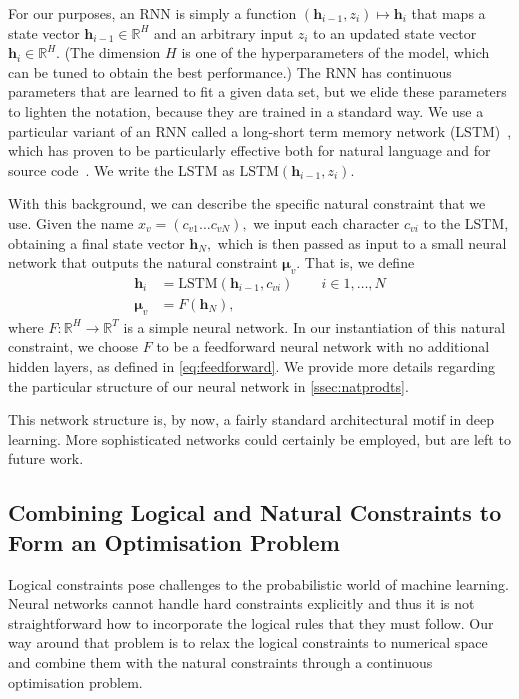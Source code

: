 \documentclass[acmsmall,nonacm]{acmart}\settopmatter{printfolios=true,printccs=false,printacmref=false}
\newcommand{\margincomment}[2]{\marginpar{\scriptsize\color{Maroon}#1 says: #2}}
\newcommand{\ivp}[1]{\margincomment{IVP}{#1}}
\begin{document}
For our purposes, an RNN is simply a function $(\bm{h}_{i-1}, z_i) \mapsto \bm{h}_{i}$
that maps a state vector $\bm{h}_{i-1} \in \mathbb{R}^H$
and an arbitrary input $z_i$ to an updated state vector $\bm{h}_{i}  \in \mathbb{R}^H$.
(The dimension $H$ is one of the hyperparameters of the model, which can be tuned
to obtain the best performance.)
The RNN has continuous parameters that are learned to fit a given data set,
but we elide these parameters to lighten the notation, because they are trained in a standard way.
We use a particular variant of an RNN called a
long-short term memory network (LSTM)~\cite{hochreiter97},
which has proven to be particularly effective both for natural language
and for source code~\cite{sundermeyer2012,melis17,white2015,dam16}.
We write the LSTM as $\text{LSTM}(\bm{h}_{i-1}, z_i)$.

With this background, we can describe the specific natural constraint that we use.
Given the name $x_v = (c_{v1} \ldots c_{vN}),$ we input each character $c_{vi}$ to the LSTM,
obtaining a final state vector $\bm{h}_N,$ which is then passed as input to a small
neural network that outputs the natural constraint $\bm{\mu}_v$.
That is, we define
\begin{subequations}\label{eq:lstm}
	\begin{align}
		\bm{h}_i   & = \text{LSTM}(\bm{h}_{i-1}, c_{vi}) \qquad i \in 1, \ldots, N \\
		\bm{\mu}_v & = F(\bm{h}_N), \label{eq:lstmb}
	\end{align}
\end{subequations}
where $F: \mathbb{R}^H \rightarrow \mathbb{R}^T$ is a simple neural network.
In our instantiation of this natural constraint, we choose $F$ to be a feedforward neural network with
no additional hidden layers, as defined in \eqref{eq:feedforward}.
We provide more details regarding the particular structure of our neural network in \cref{ssec:natprodts}.

This network structure is, by now, a fairly standard architectural motif in deep learning.
More sophisticated networks could certainly be employed, but are left to future work.

\subsection{Combining Logical and Natural Constraints to Form an Optimisation Problem}\label{ssec:optimisation}
Logical constraints pose challenges to the probabilistic world of
machine learning.  Neural networks cannot handle hard constraints explicitly and 
thus it is not straightforward how to incorporate the logical rules that they must follow.
Our way around that problem is to relax the logical constraints to numerical
space and combine them with the natural constraints through a continuous
optimisation problem.
\end{document}
